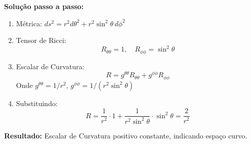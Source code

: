\documentclass[12pt]{article}
\begin{document}
\textbf{Solução passo a passo:}
\begin{enumerate}
    \item Métrica: $ds^2 = r^2 d\theta^2 + r^2 \sin^2\theta\, d\phi^2$
    \item Tensor de Ricci:
    \[
    R_{\theta\theta} = 1, \quad R_{\phi\phi} = \sin^2\theta
    \]
    \item Escalar de Curvatura:
    \[
    R = g^{\theta\theta} R_{\theta\theta} + g^{\phi\phi} R_{\phi\phi}
    \]
    Onde $g^{\theta\theta} = 1/r^2$, $g^{\phi\phi} = 1/(r^2 \sin^2\theta)$
    \item Substituindo:
    \[
    R = \frac{1}{r^2} \cdot 1 + \frac{1}{r^2 \sin^2\theta} \cdot \sin^2\theta = \frac{2}{r^2}
    \]
\end{enumerate}

\textbf{Resultado:} Escalar de Curvatura positivo constante, indicando espaço curvo.
\end{document}
